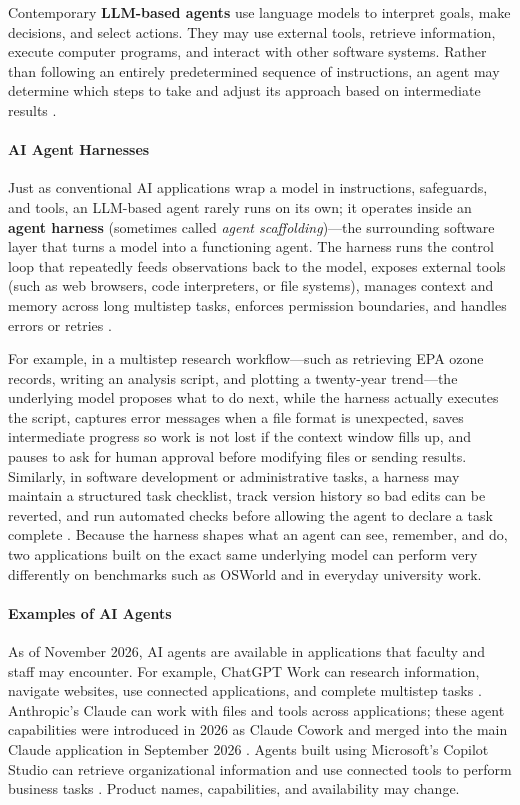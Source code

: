 \documentclass[11pt]{article}
\begin{document}
Contemporary \textbf{LLM-based agents} use language models
to interpret goals, make decisions, and select actions.
They may use external tools, retrieve information, execute
computer programs, and interact with other software systems.
Rather than following an entirely predetermined sequence of
instructions, an agent may determine which steps to take
and adjust its approach based on intermediate results
\citep{Anthropic2024Agents}.

\paragraph{AI Agent Harnesses}
Just as conventional AI applications wrap a model in instructions,
safeguards, and tools, an LLM-based agent rarely runs on its own;
it operates inside an \textbf{agent harness} (sometimes called
\emph{agent scaffolding})---the surrounding software layer that turns
a model into a functioning agent.
The harness runs the control loop that repeatedly feeds observations back to the model, exposes external tools (such as web browsers, code interpreters, or file systems), manages context and memory across long multistep tasks, enforces permission boundaries, and handles errors or retries \citep{Anthropic2025Harnesses}.

For example, in a multistep research workflow---such as retrieving EPA ozone records, writing an analysis script, and plotting a twenty-year trend---the underlying model proposes what to do next, while the harness actually executes the script, captures error messages when a file format is unexpected, saves intermediate progress so work is not lost if the context window fills up, and pauses to ask for human approval before modifying files or sending results. Similarly, in software development or administrative tasks, a harness may maintain a structured task checklist, track version history so bad edits can be reverted, and run automated checks before allowing the agent to declare a task complete \citep{Anthropic2025Harnesses}. Because the harness shapes what an agent can see, remember, and do, two applications built on the exact same underlying model can perform very differently on benchmarks such as OSWorld and in everyday university work.

\paragraph{Examples of AI Agents}
As of November 2026, AI agents are available in applications that faculty and staff may encounter. For example, ChatGPT Work can research information, navigate websites, use connected applications, and complete multistep tasks \citep{OpenAI2026Work}.
Anthropic's Claude can work with files and tools across applications; these agent capabilities were introduced in 2026 as Claude Cowork and merged into the main Claude application in September 2026
\citep{Anthropic2026Cowork}.
Agents built using Microsoft's Copilot Studio can retrieve organizational information and use connected tools to perform business tasks \citep{Microsoft2026CopilotStudio}. Product names, capabilities, and availability may change.
\end{document}
